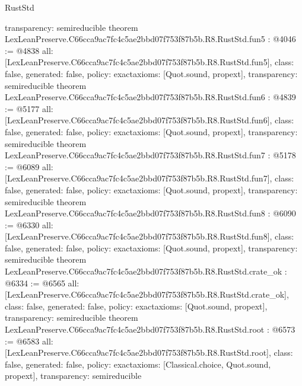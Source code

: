 \begin{lexlean}{RustStd}
\begin{coremodule}
{  transparency: semireducible
}
theorem LexLeanPreserve.C66cca9ac7fc4c5ae2bbd07f753f87b5b.R8.RustStd.fun5 : @4046 := @4838 {
  all: [LexLeanPreserve.C66cca9ac7fc4c5ae2bbd07f753f87b5b.R8.RustStd.fun5],
  class: false,
  generated: false,
  policy: exact{axioms: [Quot.sound, propext]},
  transparency: semireducible
}
theorem LexLeanPreserve.C66cca9ac7fc4c5ae2bbd07f753f87b5b.R8.RustStd.fun6 : @4839 := @5177 {
  all: [LexLeanPreserve.C66cca9ac7fc4c5ae2bbd07f753f87b5b.R8.RustStd.fun6],
  class: false,
  generated: false,
  policy: exact{axioms: [Quot.sound, propext]},
  transparency: semireducible
}
theorem LexLeanPreserve.C66cca9ac7fc4c5ae2bbd07f753f87b5b.R8.RustStd.fun7 : @5178 := @6089 {
  all: [LexLeanPreserve.C66cca9ac7fc4c5ae2bbd07f753f87b5b.R8.RustStd.fun7],
  class: false,
  generated: false,
  policy: exact{axioms: [Quot.sound, propext]},
  transparency: semireducible
}
theorem LexLeanPreserve.C66cca9ac7fc4c5ae2bbd07f753f87b5b.R8.RustStd.fun8 : @6090 := @6330 {
  all: [LexLeanPreserve.C66cca9ac7fc4c5ae2bbd07f753f87b5b.R8.RustStd.fun8],
  class: false,
  generated: false,
  policy: exact{axioms: [Quot.sound, propext]},
  transparency: semireducible
}
theorem LexLeanPreserve.C66cca9ac7fc4c5ae2bbd07f753f87b5b.R8.RustStd.crate_ok : @6334 := @6565 {
  all: [LexLeanPreserve.C66cca9ac7fc4c5ae2bbd07f753f87b5b.R8.RustStd.crate_ok],
  class: false,
  generated: false,
  policy: exact{axioms: [Quot.sound, propext]},
  transparency: semireducible
}
theorem LexLeanPreserve.C66cca9ac7fc4c5ae2bbd07f753f87b5b.R8.RustStd.root : @6573 := @6583 {
  all: [LexLeanPreserve.C66cca9ac7fc4c5ae2bbd07f753f87b5b.R8.RustStd.root],
  class: false,
  generated: false,
  policy: exact{axioms: [Classical.choice, Quot.sound, propext]},
  transparency: semireducible
}


\end{coremodule}
\end{lexlean}
